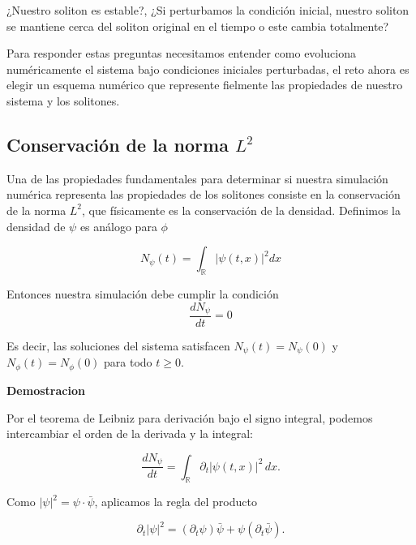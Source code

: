 \documentclass[letterpaper,11pt]{exam}
\newcommand{\R}{\mathbb R}
\theoremstyle{plain}
\begin{document}
\hspace{2mm}

¿Nuestro soliton es estable?, ¿Si perturbamos la condición inicial, nuestro soliton se mantiene cerca del soliton original en el tiempo o este cambia totalmente?

\hspace{2mm}

Para responder estas preguntas necesitamos entender como evoluciona numéricamente el sistema bajo condiciones iniciales perturbadas, el reto ahora es elegir un esquema numérico que represente fielmente las propiedades de nuestro sistema y los solitones.

\hspace{2mm}


\subsection{Conservación de la norma $L^2$}
Una de las propiedades fundamentales para determinar si nuestra simulación numérica representa las propiedades de los solitones consiste en la conservación de la norma $L^2$, que físicamente es la conservación de la densidad. Definimos la densidad de $\psi$ es análogo para $\phi$

\begin{equation}
    N_\psi(t)=\int_\R|\psi(t,x)|^2 dx
\end{equation}


Entonces nuestra simulación debe cumplir la condición
\begin{equation}
\frac{dN_\psi}{dt}=0
\end{equation}

Es decir, las soluciones del sistema satisfacen $N_\psi(t) = N_\psi(0)$ y 
$N_\phi(t) = N_\phi(0)$ para todo $t \geq 0$.

\hspace{2mm}

\textbf{Demostracion}


Por el teorema de Leibniz para derivación bajo el signo integral, podemos 
intercambiar el orden de la derivada y la integral:

\begin{equation*}
    \frac{dN_\psi}{dt} = \int_{\mathbb{R}}\partial_t|\psi(t,x)|^2\,dx.
\end{equation*}

Como $|\psi|^2 = \psi\cdot\bar\psi$, aplicamos la regla del producto

\begin{equation*}
    \partial_t|\psi|^2 = (\partial_t\psi)\bar\psi + \psi(\partial_t\bar\psi).
\end{equation*}
\end{document}
